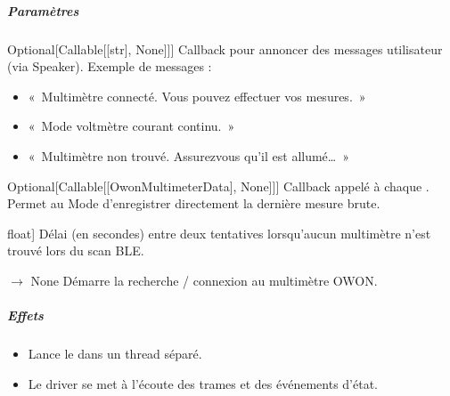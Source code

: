 \documentclass[letterpaper,10pt,french]{sphinxmanual}
\begin{document}
\begin{fulllineitems}
\begin{fulllineitems}
\subparagraph{Paramètres}
\label{\detokenize{api/hardware.devices:id4}}\begin{description}
\sphinxlineitem{on\_status}{[}Optional{[}Callable{[}{[}str{]}, None{]}{]}{]}
\sphinxAtStartPar
Callback pour annoncer des messages utilisateur (via Speaker).
Exemple de messages :
\begin{itemize}
\item {} 
\sphinxAtStartPar
« Multimètre connecté. Vous pouvez effectuer vos mesures. »

\item {} 
\sphinxAtStartPar
« Mode voltmètre courant continu. »

\item {} 
\sphinxAtStartPar
« Multimètre non trouvé. Assurez\sphinxhyphen{}vous qu’il est allumé… »

\end{itemize}

\sphinxlineitem{on\_new\_measure}{[}Optional{[}Callable{[}{[}OwonMultimeterData{]}, None{]}{]}{]}
\sphinxAtStartPar
Callback appelé à chaque .
Permet au Mode d’enregistrer directement la dernière mesure brute.

\sphinxlineitem{retry\_delay}{[}float{]}
\sphinxAtStartPar
Délai (en secondes) entre deux tentatives lorsqu’aucun multimètre
n’est trouvé lors du scan BLE.

\end{description}

\end{fulllineitems}


\begin{fulllineitems}
\label{\detokenize{api/hardware.devices:hardware.devices.owon_multimeter.OwonMultimeterDriver.start}}
\pysigstartsignatures
\pysiglinewithargsret
{}
{}
{{ $\rightarrow$ None}}
\pysigstopsignatures
\sphinxAtStartPar
Démarre la recherche / connexion au multimètre OWON.


\subparagraph{Effets}
\label{\detokenize{api/hardware.devices:effets}}\begin{itemize}
\item {} 
\sphinxAtStartPar
Lance le  dans un thread séparé.

\item {} 
\sphinxAtStartPar
Le driver se met à l’écoute des trames et des événements d’état.


\end{itemize}
\end{fulllineitems}
\end{fulllineitems}
\end{document}
